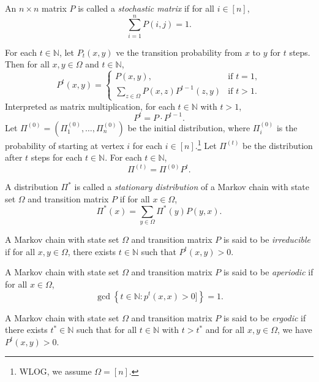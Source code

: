\documentclass[letterpaper, reqno,11pt]{article}
\newcommand{\NN}{\mathbb{N}}
\begin{document}
\begin{definition}
  An $n \times n$ matrix $P$ is called a \emph{stochastic matrix} if for all $i \in [n]$,
  $$ \sum_{i = 1}^n P(i, j) = 1. $$
\end{definition}

For each $t \in \NN$, let $P_t(x, y)$ ve the transition probability from $x$ to $y$ for $t$ steps. Then for all $x, y \in \Omega$ and $t \in \NN$,
$$ P^t(x, y) = \left\{
  \begin{array}{ll}
    P(x, y), & \text{if $t = 1$}, \\
    \sum_{z \in \Omega} P(x, z) P^{t - 1}(z, y) & \text{if $t > 1$}.
  \end{array}
\right. $$
Interpreted as matrix multiplication, for each $t \in \NN$ with $t > 1$,
$$ P^t = P \cdot P^{t - 1}. $$
Let $\Pi^{(0)} = (\Pi_1^{(0)}, \ldots, \Pi_n^{(0)})$ be the initial distribution, where $\Pi_i^{(0)}$ is the probability of starting at vertex $i$ for each $i \in [n]$.\footnote{WLOG, we assume $\Omega = [n]$.} Let $\Pi^{(t)}$ be the distribution after $t$ steps for each $t \in \NN$. For each $t \in \NN$,
$$ \Pi^{(t)} = \Pi^{(0)} P^t. $$

\begin{definition}
  A distribution $\Pi^*$ is called a \emph{stationary distribution} of a Markov chain with state set $\Omega$ and transition matrix $P$ if for all $x \in \Omega$,
  $$ \Pi^*(x) = \sum_{y \in \Omega} \Pi^*(y) P(y, x). $$
\end{definition}

\begin{definition}
  A Markov chain with state set $\Omega$ and transition matrix $P$ is said to be \emph{irreducible} if for all $x, y \in \Omega$, there exists $t \in \NN$ such that $P^t(x, y) > 0$.
\end{definition}

\begin{definition}
  A Markov chain with state set $\Omega$ and transition matrix $P$ is said to be \emph{aperiodic} if for all $x \in \Omega$,
  $$ \gcd\left\{ t \in \NN : p^t(x, x) > 0 ]\right\} = 1. $$
\end{definition}

\begin{definition}
  A Markov chain with state set $\Omega$ and transition matrix $P$ is said to be \emph{ergodic} if there exists $t^* \in \NN$ such that for all $t \in \NN$ with $t > t^*$ and for all $x, y \in \Omega$, we have $P^t(x, y) > 0$.
\end{definition}
\end{document}
